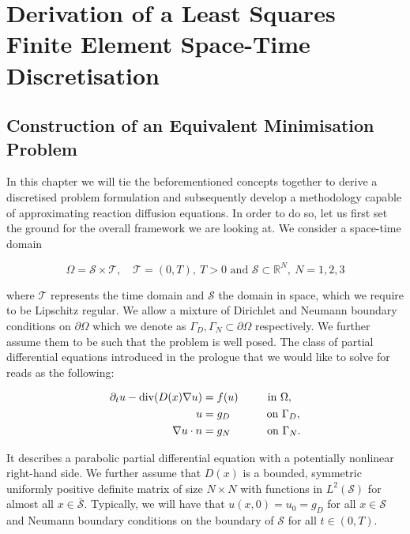 \documentclass[../draft_1.tex]{subfiles}
\begin{document}
\chapter{Derivation of a  Least Squares Finite Element Space-Time Discretisation}
\section{Construction of an Equivalent Minimisation Problem}

In this chapter we will tie the beforementioned concepts together to derive a discretised problem formulation and subsequently develop a methodology capable of approximating reaction diffusion equations. In order to do so, let us first set the ground for the overall framework we are looking at. We consider a space-time domain 
\begin{ceqn}
\begin{equation}
\Omega = \mathcal{S} \times \mathcal{T}, \quad \mathcal{T} = (0,T), \ T>0 \text{ and }  \mathcal{S} \subset \mathbb{R}^N, \ N = 1,2,3
\end{equation} 
\end{ceqn}
where $\mathcal{T} $ represents the time domain and $ \mathcal{S}$ the domain in space, which we require to be Lipschitz regular. We allow a mixture of Dirichlet and Neumann boundary conditions on $\partial \Omega$ which we denote as $\Gamma_D, \Gamma_N \subset \partial \Omega$ respectively. We further assume them to be such that the problem is well posed. The class of partial differential equations introduced in the prologue that we would like to solve for reads as the following:
\begin{ceqn}
\begin{align}
\begin{aligned}
\label{strong_form}
\partial_t u - \mathop{}\!\mathrm{div} (D(x) \nabla u) &= f(u) \qquad \  \text{ in } \Omega, \\
u &= g_D \quad \qquad \text{ on } \Gamma_D, \\
\nabla u \cdot n &= g_N \quad \qquad \text{ on } \Gamma_N.
\end{aligned}
\end{align}
\end{ceqn}
It describes a parabolic partial differential equation with a potentially nonlinear right-hand side. We further assume that $D(x)$ is a bounded, symmetric uniformly positive definite matrix of size $N \times N$ with functions in $L^2(\mathcal{S})$ for almost all $ x \in \bar{\mathcal{S}}$. Typically, we will have that $u(x,0) = u_0 = g_D$ for all $ x \in \mathcal{S}$ and Neumann boundary conditions on the boundary of $\mathcal{S}$ for all $t \in (0,T)$. 
\end{document}
